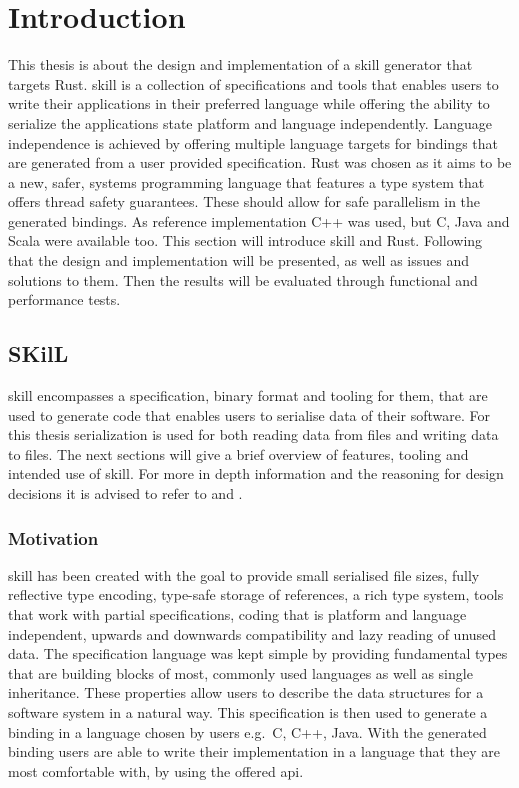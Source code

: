 \documentclass[thesis]{subfiles}
\begin{document}
\chapter{Introduction}\label{sec:intro}
This thesis is about the design and implementation of a \gls{skill} generator that targets Rust.
\gls{skill} is a collection of specifications and tools that enables users to write their applications in their preferred language while offering the ability to serialize the applications state platform and language independently\autocite{skill-tr}.
Language independence is achieved by offering multiple language targets for bindings that are generated from a user provided specification.
Rust was chosen as it aims to be a new, safer, systems programming language that features a type system that offers thread safety guarantees\autocite{rust-org}.
These should allow for safe parallelism in the generated bindings.
As reference implementation C++ was used, but C, Java and Scala were available too.
This section will introduce \gls{skill} and Rust.
Following that the design and implementation will be presented, as well as issues and solutions to them.
Then the results will be evaluated through functional and performance tests.

\section{SKilL}\label{sec:skill}
  \gls{skill} encompasses a specification, binary format and tooling for them, that are used to generate code that enables users to serialise data of their software.
  For this thesis serialization is used for both reading data from files and writing data to files.
  The next sections will give a brief overview of features, tooling and intended use of \gls{skill}.
  For more in depth information and the reasoning for design decisions it is advised to refer to \autocite{skill-tr} and \autocite{skill-dis}.

  \subsection{Motivation}
    \gls{skill} has been created with the goal to provide small serialised file sizes, fully reflective type encoding, type-safe storage of references, a rich type system, tools that work with partial specifications,
    coding that is platform and language independent, upwards and downwards compatibility and lazy reading of unused data.
    The specification language was kept simple by providing fundamental types that are building blocks of most, commonly used languages as well as single inheritance.
    These properties allow users to describe the data structures for a software system in a natural way.
    This specification is then used to generate a binding in a language chosen by users e.g.~C, C++, Java.
    With the generated binding users are able to write their implementation in a language that they are most comfortable with, by using the offered \gls{api}.
    \autocite{skill-tr}
\end{document}
